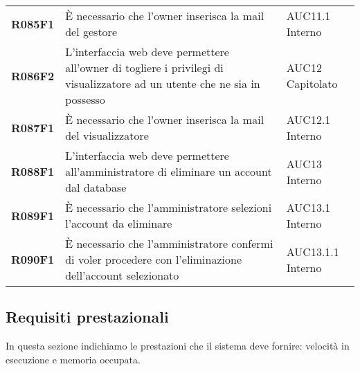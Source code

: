 \documentclass[../analisi-dei-requisiti.tex]{subfiles}
\begin{document}
\begin{longtable}[H]{>{\centering\bfseries}m{3cm} >{\centering}m{10cm} >{\centering\arraybackslash}m{3cm}}
  R085F1                               & È necessario che l'owner inserisca la mail del gestore                                                                                                                                                  & AUC11.1 Interno               \\
  R086F2                               & L'interfaccia web deve permettere all'owner di togliere i privilegi di visualizzatore ad un utente che ne sia in possesso                                                                               & AUC12 Capitolato              \\
  R087F1                               & È necessario che l'owner inserisca la mail del visualizzatore                                                                                                                                           & AUC12.1 Interno               \\
  R088F1                               & L'interfaccia web deve permettere all'amministratore di eliminare un account dal database                                                                                                               & AUC13 Interno                 \\
  R089F1                               & È necessario che l'amministratore selezioni l'account da eliminare                                                                                                                                      & AUC13.1 Interno               \\
  R090F1                               & È necessario che l'amministratore confermi di voler procedere con l'eliminazione dell'account selezionato                                                                                               & AUC13.1.1 Interno             \\
\end{longtable}

\newpage
\subsection{Requisiti prestazionali}%
\label{sub:requisiti_prestazionali}
In questa sezione indichiamo le prestazioni che il sistema deve fornire: velocità in esecuzione e memoria occupata.
\end{document}
